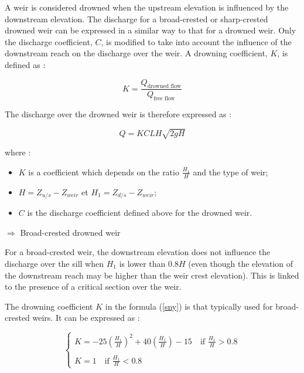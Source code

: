 \vspace{0.5cm}

A weir is considered drowned when the upstream elevation is influenced by the downstream elevation. The discharge for a broad-crested or sharp-crested drowned weir can be expressed in a similar way to that for a drowned weir. Only the discharge coefficient, $C$, is modified to take into account the influence of the downstream reach on the discharge over the weir. A drowning coefficient, $K$, is defined as :

\begin{equation}
 K = \frac{Q_{\mbox{drowned flow}}}{Q_{\mbox{free flow}}}
\end{equation}

\vspace{0.5cm}

The discharge over the drowned weir is therefore expressed as :

\begin{equation}
 \label{sny}
 Q = K C L H \sqrt{2 g H}
\end{equation}

where :
\begin{itemize}
 \item $K$ is a coefficient which depends on the ratio $\frac{H_1}{H}$ and the type of weir;
 \item $H=Z_{u/s}-Z_{weir}$ et $H_1 = Z_{d/s}-Z_{weir}$;
 \item $C$ is the discharge coefficient defined above for the drowned weir.
\end{itemize}

\vspace{0.5cm}

$\Longrightarrow$ Broad-crested drowned weir

\vspace{0.5cm}

For a broad-crested weir, the downstream elevation does not influence the discharge over the sill when $H_1$ is lower than $0.8H$ (even though the elevation of the downstream reach may be higher than the weir crest elevation). This is linked to the presence of a critical section over the weir.

\vspace{0.5cm}

The drowning coefficient $K$ in the formula (\ref{sny}) is that typically used for broad-crested weirs. It can be expressed as :

\begin{equation}
 \left \lbrace
  \begin{array}{l}
    K = -25 \left ( \frac{H_1}{H} \right )^2 + 40 \left ( \frac{H_1}{H} \right ) - 15 \quad \mbox{if } \frac{H_1}{H} > 0.8\\
    \\
    K = 1 \quad \mbox{if } \frac{H_1}{H} < 0.8
  \end{array}
 \right.
\end{equation}



